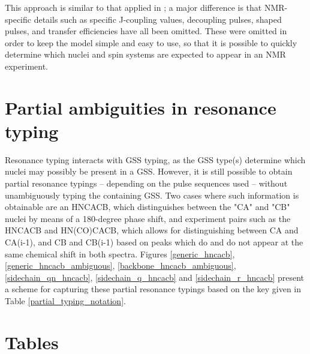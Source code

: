 This approach is similar to that applied in \cite{fox2004delineation}; a major
difference is that NMR-specific details such as specific J-coupling values, 
decoupling pulses, shaped pulses, and transfer efficiencies have all been 
omitted.  These were omitted in order to keep the model simple and easy to use,
so that it is possible to quickly determine which nuclei and spin systems are 
expected to appear in an NMR experiment.


\section{Partial ambiguities in resonance typing}
Resonance typing interacts with GSS typing, as the GSS type(s) determine
which nuclei may possibly be present in a GSS.
However, it is still possible to obtain partial 
resonance typings -- depending on the pulse sequences used -- without
unambiguously typing the containing GSS.  Two cases where such information
is obtainable are an HNCACB, which distinguishes between the "CA" and "CB"
nuclei by means of a 180-degree phase shift, and experiment pairs such as the
HNCACB and HN(CO)CACB, which allows for distinguishing between CA and CA(i-1),
and CB and CB(i-1) based on peaks which do and do not appear at the same 
chemical shift in both spectra.
Figures 
\ref{generic_hncacb},
\ref{generic_hncacb_ambiguous},
\ref{backbone_hncacb_ambiguous},
\ref{sidechain_qn_hncacb},
\ref{sidechain_q_hncacb} and
\ref{sidechain_r_hncacb}
present a scheme for capturing these partial resonance typings based on the
key given in Table \ref{partial_typing_notation}.


\clearpage
\section{Tables}

